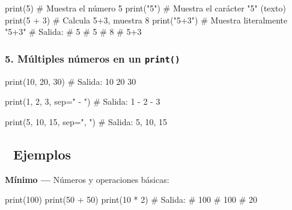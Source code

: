 \documentclass[
  doc,
  floatsintext,
  longtable,
  a4paper,
  nolmodern,
  notxfonts,
  notimes,
  12pt,
  colorlinks=true,linkcolor=blue,citecolor=blue,urlcolor=blue]{apa7}
\newenvironment{Shaded}{\begin{snugshade}}{\end{snugshade}}
\newcommand{\BuiltInTok}[1]{\textcolor[rgb]{0.00,0.23,0.31}{#1}}
\newcommand{\CommentTok}[1]{\textcolor[rgb]{0.37,0.37,0.37}{#1}}
\newcommand{\DecValTok}[1]{\textcolor[rgb]{0.68,0.00,0.00}{#1}}
\newcommand{\NormalTok}[1]{\textcolor[rgb]{0.00,0.23,0.31}{#1}}
\newcommand{\OperatorTok}[1]{\textcolor[rgb]{0.37,0.37,0.37}{#1}}
\newcommand{\StringTok}[1]{\textcolor[rgb]{0.13,0.47,0.30}{#1}}
\begin{document}
\begin{Shaded}
\begin{Highlighting}[]
\BuiltInTok{print}\NormalTok{(}\DecValTok{5}\NormalTok{)       }\CommentTok{\# Muestra el número 5}
\BuiltInTok{print}\NormalTok{(}\StringTok{"5"}\NormalTok{)     }\CommentTok{\# Muestra el carácter "5" (texto)}
\BuiltInTok{print}\NormalTok{(}\DecValTok{5} \OperatorTok{+} \DecValTok{3}\NormalTok{)   }\CommentTok{\# Calcula 5+3, muestra 8}
\BuiltInTok{print}\NormalTok{(}\StringTok{"5+3"}\NormalTok{)   }\CommentTok{\# Muestra literalmente "5+3"}
\CommentTok{\# Salida:}
\CommentTok{\# 5}
\CommentTok{\# 5}
\CommentTok{\# 8}
\CommentTok{\# 5+3}
\end{Highlighting}
\end{Shaded}

\subsubsection{\texorpdfstring{5. Múltiples números en un
\texttt{print()}}{5. Múltiples números en un print()}}\label{muxfaltiples-nuxfameros-en-un-print}

\begin{Shaded}
\begin{Highlighting}[]
\BuiltInTok{print}\NormalTok{(}\DecValTok{10}\NormalTok{, }\DecValTok{20}\NormalTok{, }\DecValTok{30}\NormalTok{)}
\CommentTok{\# Salida: 10 20 30}

\BuiltInTok{print}\NormalTok{(}\DecValTok{1}\NormalTok{, }\DecValTok{2}\NormalTok{, }\DecValTok{3}\NormalTok{, sep}\OperatorTok{=}\StringTok{" {-} "}\NormalTok{)}
\CommentTok{\# Salida: 1 {-} 2 {-} 3}

\BuiltInTok{print}\NormalTok{(}\DecValTok{5}\NormalTok{, }\DecValTok{10}\NormalTok{, }\DecValTok{15}\NormalTok{, sep}\OperatorTok{=}\StringTok{", "}\NormalTok{)}
\CommentTok{\# Salida: 5, 10, 15}
\end{Highlighting}
\end{Shaded}

\subsection{🔬 Ejemplos}\label{ejemplos}

\textbf{Mínimo ---} Números y operaciones básicas:

\begin{Shaded}
\begin{Highlighting}[]
\BuiltInTok{print}\NormalTok{(}\DecValTok{100}\NormalTok{)}
\BuiltInTok{print}\NormalTok{(}\DecValTok{50} \OperatorTok{+} \DecValTok{50}\NormalTok{)}
\BuiltInTok{print}\NormalTok{(}\DecValTok{10} \OperatorTok{*} \DecValTok{2}\NormalTok{)}
\CommentTok{\# Salida:}
\CommentTok{\# 100}
\CommentTok{\# 100}
\CommentTok{\# 20}
\end{Highlighting}
\end{Shaded}
\end{document}
